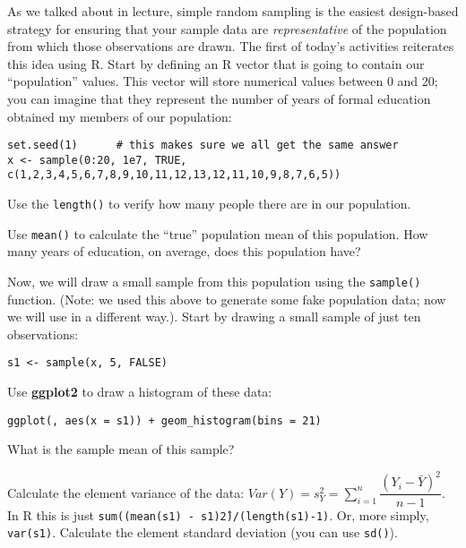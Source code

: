 \documentclass[a4paper,12pt]{article}
\begin{document}
\begin{enumerate*}
\item As we talked about in lecture, simple random sampling is the easiest design-based strategy for ensuring that your sample data are \textit{representative} of the population from which those observations are drawn. The first of today's activities reiterates this idea using R. Start by defining an R vector that is going to contain our ``population'' values. This vector will store numerical values between 0 and 20; you can imagine that they represent the number of years of formal education obtained my members of our population:

\begin{verbatim}
set.seed(1)      # this makes sure we all get the same answer
x <- sample(0:20, 1e7, TRUE, c(1,2,3,4,5,6,7,8,9,10,11,12,13,12,11,10,9,8,7,6,5))
\end{verbatim}

\item Use the \texttt{length()} to verify how many people there are in our population.

\item Use \texttt{mean()} to calculate the ``true'' population mean of this population. How many years of education, on average, does this population have?

\item Now, we will draw a small sample from this population using the \texttt{sample()} function. (Note: we used this above to generate some fake population data; now we will use in a different way.). Start by drawing a small sample of just ten observations:

\begin{verbatim}
s1 <- sample(x, 5, FALSE)
\end{verbatim}

\item Use \textbf{ggplot2} to draw a histogram of these data:

\begin{verbatim}
ggplot(, aes(x = s1)) + geom_histogram(bins = 21)
\end{verbatim}

\item What is the sample mean of this sample?

\item Calculate the element variance of the data: $Var(Y) = s_Y^2 = \sum_{i=1}^{n} \dfrac{(Y_i - \bar{Y})^2}{n-1}$. In R this is just \texttt{sum((mean(s1) - s1)\^2)/(length(s1)-1)}. Or, more simply, \texttt{var(s1)}. Calculate the element standard deviation (you can use \texttt{sd()}).


\end{enumerate*}
\end{document}
